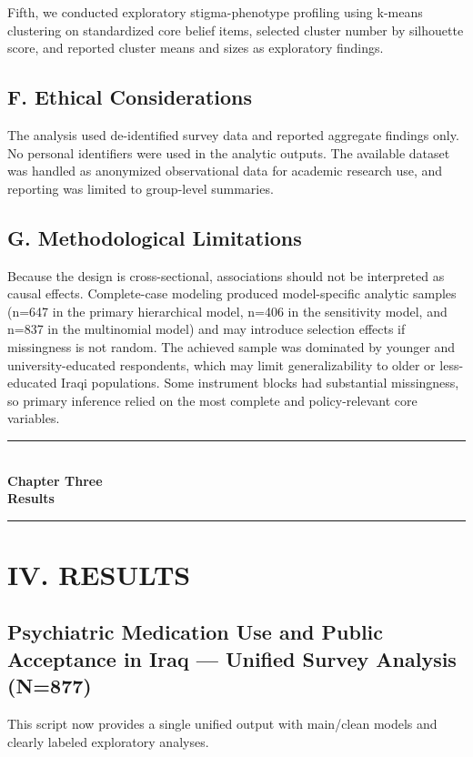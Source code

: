 \documentclass[12pt,a4paper]{article}
\begin{document}
Fifth, we conducted exploratory stigma-phenotype profiling using k-means clustering on standardized core belief items, selected cluster number by silhouette score, and reported cluster means and sizes as exploratory findings.

\subsection*{F. Ethical Considerations}
The analysis used de-identified survey data and reported aggregate findings only. No personal identifiers were used in the analytic outputs. The available dataset was handled as anonymized observational data for academic research use, and reporting was limited to group-level summaries.

\subsection*{G. Methodological Limitations}
Because the design is cross-sectional, associations should not be interpreted as causal effects. Complete-case modeling produced model-specific analytic samples (n=647 in the primary hierarchical model, n=406 in the sensitivity model, and n=837 in the multinomial model) and may introduce selection effects if missingness is not random. The achieved sample was dominated by younger and university-educated respondents, which may limit generalizability to older or less-educated Iraqi populations. Some instrument blocks had substantial missingness, so primary inference relied on the most complete and policy-relevant core variables.

\newpage
\thispagestyle{plain}
\begin{center}\vspace*{0.30\textheight}
{\Large\bfseries\rule{4cm}{0.4pt}}\\[10pt]
{\Huge\bfseries Chapter Three}\\[8pt]
{\Large\bfseries Results}\\[10pt]
{\Large\bfseries\rule{4cm}{0.4pt}}
\end{center}
\newpage
\section*{IV. RESULTS}
\subsection*{Psychiatric Medication Use and Public Acceptance in Iraq — Unified Survey Analysis (N=877)}
This script now provides a single unified output with main/clean models and clearly labeled exploratory analyses.
\end{document}
